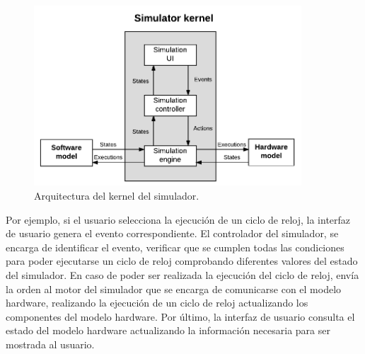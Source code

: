 \begin{figure}[htbp]
 	\centering
 	\includegraphics[width=10cm]{figures/kernel_diagram}
 	\caption{Arquitectura del kernel del simulador.}
	\label{fig:kernel_diagram}
\end{figure}

Por ejemplo, si el usuario selecciona la ejecución de un ciclo de reloj, la interfaz de usuario genera el evento correspondiente. El controlador del simulador, se encarga de identificar el evento, verificar que se cumplen todas las condiciones para poder ejecutarse un ciclo de reloj comprobando diferentes valores del estado del simulador. En caso de poder ser realizada la ejecución del ciclo de reloj, envía la orden al motor del simulador que se encarga de comunicarse con el  modelo \gls{hardware}, realizando la ejecución de un ciclo de reloj actualizando los componentes del modelo \gls{hardware}. Por último, la interfaz de usuario consulta el estado del modelo \gls{hardware} actualizando la información necesaria para ser mostrada al usuario.





